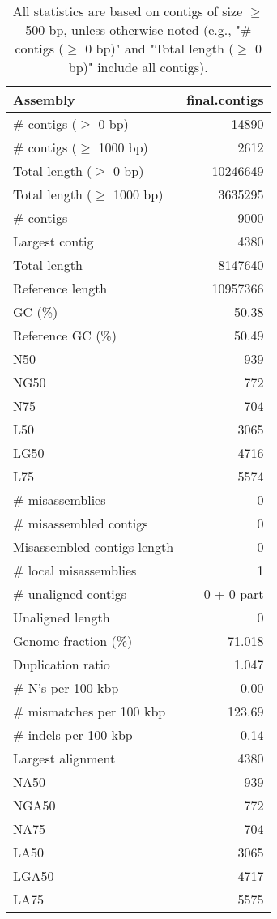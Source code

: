 \documentclass[12pt,a4paper]{article}
\begin{document}
\begin{table}[ht]
\begin{center}
\caption{All statistics are based on contigs of size $\geq$ 500 bp, unless otherwise noted (e.g., "\# contigs ($\geq$ 0 bp)" and "Total length ($\geq$ 0 bp)" include all contigs).}
\begin{tabular}{|l*{1}{|r}|}
\hline
Assembly & final.contigs \\ \hline
\# contigs ($\geq$ 0 bp) & 14890 \\ \hline
\# contigs ($\geq$ 1000 bp) & 2612 \\ \hline
Total length ($\geq$ 0 bp) & 10246649 \\ \hline
Total length ($\geq$ 1000 bp) & 3635295 \\ \hline
\# contigs & 9000 \\ \hline
Largest contig & 4380 \\ \hline
Total length & 8147640 \\ \hline
Reference length & 10957366 \\ \hline
GC (\%) & 50.38 \\ \hline
Reference GC (\%) & 50.49 \\ \hline
N50 & 939 \\ \hline
NG50 & 772 \\ \hline
N75 & 704 \\ \hline
L50 & 3065 \\ \hline
LG50 & 4716 \\ \hline
L75 & 5574 \\ \hline
\# misassemblies & 0 \\ \hline
\# misassembled contigs & 0 \\ \hline
Misassembled contigs length & 0 \\ \hline
\# local misassemblies & 1 \\ \hline
\# unaligned contigs & 0 + 0 part \\ \hline
Unaligned length & 0 \\ \hline
Genome fraction (\%) & 71.018 \\ \hline
Duplication ratio & 1.047 \\ \hline
\# N's per 100 kbp & 0.00 \\ \hline
\# mismatches per 100 kbp & 123.69 \\ \hline
\# indels per 100 kbp & 0.14 \\ \hline
Largest alignment & 4380 \\ \hline
NA50 & 939 \\ \hline
NGA50 & 772 \\ \hline
NA75 & 704 \\ \hline
LA50 & 3065 \\ \hline
LGA50 & 4717 \\ \hline
LA75 & 5575 \\ \hline
\end{tabular}
\end{center}
\end{table}
\end{document}

